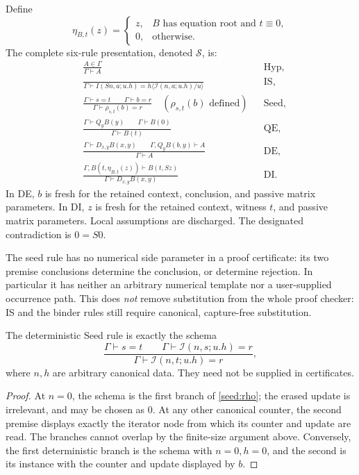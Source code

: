 Define
\[
 \eta_{B,t}(z)=
 \begin{cases}
 z,&B\text{ has equation root and }t\equiv0,\\
 0,&\text{otherwise}.
 \end{cases}
\]
The complete six-rule presentation, denoted $\mathcal S$, is:
\begin{align*}
 &\frac{A\in\Gamma}{\Gamma\vdash A}
 &&\text{Hyp},\\[3pt]
 &\frac{}{\Gamma\vdash
 I(Sn,a;u.h)=h\langle\mathcal I(n,a;u.h)/u\rangle}
 &&\text{IS},\\[3pt]
 &\frac{\Gamma\vdash s=t\qquad\Gamma\vdash b=r}
 {\Gamma\vdash \rho_{s,t}(b)=r}
 \quad(\rho_{s,t}(b)\text{ defined})
 &&\text{Seed},\\[3pt]
 &\frac{\Gamma\vdash Q_yB(y)\qquad\Gamma\vdash B(0)}
 {\Gamma\vdash B(t)}
 &&\text{QE},\\[3pt]
 &\frac{\Gamma\vdash D_{x,y}B(x,y)\qquad
 \Gamma,Q_yB(b,y)\vdash A}{\Gamma\vdash A}
 &&\text{DE},\\[3pt]
 &\frac{\Gamma,B(t,\eta_{B,t}(z))\vdash B(t,Sz)}
 {\Gamma\vdash D_{x,y}B(x,y)}
 &&\text{DI}.
\end{align*}
In DE, $b$ is fresh for the retained context, conclusion, and passive
matrix parameters. In DI, $z$ is fresh for the retained context, witness
$t$, and passive matrix parameters. Local assumptions are discharged.
The designated contradiction is $0=S0$.

The seed rule has no numerical side parameter in a proof certificate:
its two premise conclusions determine the conclusion, or determine
rejection. In particular it has neither an arbitrary numerical template
nor a user-supplied occurrence path. This does \emph{not} remove
substitution from the whole proof checker: IS and the binder rules still
require canonical, capture-free substitution.

\begin{lemma}\label{seed:schema}
The deterministic Seed rule is exactly the schema
\[
 \frac{\Gamma\vdash s=t\qquad
 \Gamma\vdash\mathcal I(n,s;u.h)=r}
 {\Gamma\vdash \mathcal I(n,t;u.h)=r},
 \tag{K}\label{seed:K}
\]
where $n,h$ are arbitrary canonical data. They need not be supplied in
certificates.
\end{lemma}
\begin{proof}
At $n=0$, the schema is the first branch of
\eqref{seed:rho}; the erased update is irrelevant, and may be chosen as
$0$. At any other canonical counter, the second premise displays
exactly the iterator node from which its counter and update are read.
The branches cannot overlap by the finite-size argument above. Conversely,
the first deterministic branch is the schema with $n=0,h=0$, and the
second is its instance with the counter and update displayed by $b$.
\end{proof}

